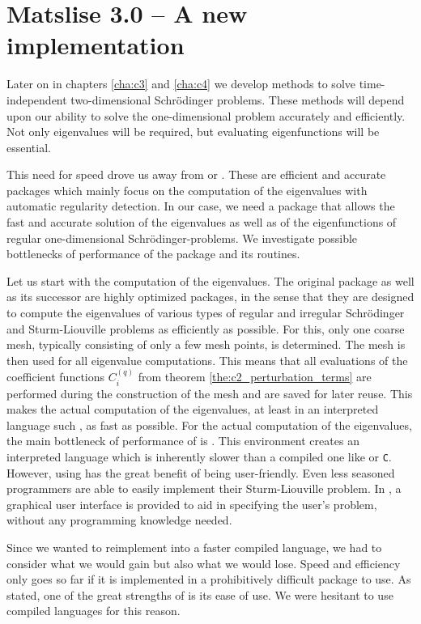 \section{Matslise 3.0 -- A new implementation}\label{sec:c2_the_implementation}

Later on in chapters \ref{cha:c3} and \ref{cha:c4} we develop methods to solve time-independent two-dimensional Schrödinger problems. These methods will depend upon our ability to solve the one-dimensional problem accurately and efficiently. Not only eigenvalues will be required, but evaluating eigenfunctions will be essential.

This need for speed drove us away from \matslise{} or . These are efficient and accurate packages which mainly focus on the computation of the eigenvalues with automatic regularity detection. In our case, we need a package that allows the fast and accurate solution of the eigenvalues as well as of the eigenfunctions of regular one-dimensional Schrödinger-problems. We investigate possible bottlenecks of performance of the  package and its routines.

Let us start with the computation of the eigenvalues. The original \matslise{} package as well as its successor  are highly optimized packages, in the sense that they are designed to compute the eigenvalues of various types of regular and irregular Schrödinger and Sturm-Liouville problems as efficiently as possible. For this, only one coarse mesh, typically consisting of only a few mesh points, is determined. The mesh is then used for all eigenvalue computations. This means that all evaluations of the coefficient functions $C_i^(q)$ from theorem \ref{the:c2_perturbation_terms} are performed during the construction of the mesh and are saved for later reuse. This makes the actual computation of the eigenvalues, at least in an interpreted language such \matlab{}, as fast as possible. For the actual computation of the eigenvalues, the main bottleneck of performance of  is \matlab{}. This environment creates an interpreted language which is inherently slower than a compiled one like \fortran{} or \texttt{C}. However, using \matlab{} has the great benefit of being user-friendly. Even less seasoned programmers are able to easily implement their Sturm-Liouville problem. In , a graphical user interface is provided to aid in specifying the user's problem, without any programming knowledge needed.

Since we wanted to reimplement \matslise{} into a faster compiled language, we had to consider what we would gain but also what we would lose. Speed and efficiency only goes so far if it is implemented in a prohibitively difficult package to use. As stated, one of the great strengths of  is its ease of use. We were hesitant to use compiled languages for this reason.

